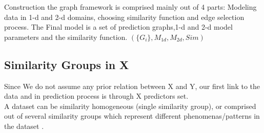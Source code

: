 \documentclass[a4paper]{article}
\begin{document}
Construction the  graph framework is comprised mainly out of 4 parts:
Modeling data in 1-d and 2-d domains, choosing similarity function and edge selection process.
The Final model is a set of prediction graphs,1-d and 2-d model parameters and the similarity function.
$(\{G{_i}\},M_{1d},M_{2d},Sim)$

\subsection{Similarity Groups in X }
Since We do not assume any prior relation between X and Y, 
our first link to  the data and in prediction process is through X predictors set.\\
A dataset can be similarity homogeneous (single similarity group), or comprised out of several similarity groups which represent different phenomenas/patterns in the dataset .
\end{document}

